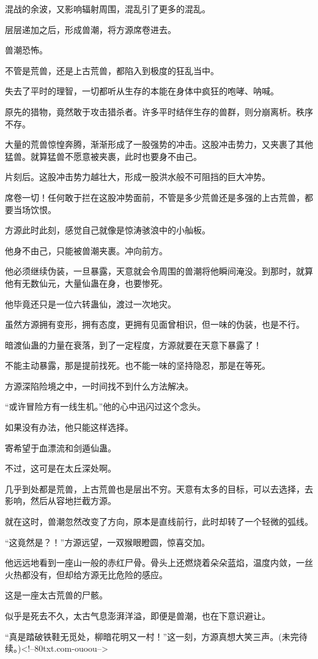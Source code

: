 \begin{this_body}
混战的余波，又影响辐射周围，混乱引了更多的混乱。

层层递加之后，形成兽潮，将方源席卷进去。

兽潮恐怖。

不管是荒兽，还是上古荒兽，都陷入到极度的狂乱当中。

失去了平时的理智，一切都听从生存的本能在身体中疯狂的咆哮、呐喊。

原先的猎物，竟然敢于攻击猎杀者。许多平时结伴生存的兽群，则分崩离析。秩序不存。

大量的荒兽惊惶奔腾，渐渐形成了一股强势的冲击。这股冲击势力，又夹裹了其他猛兽。就算猛兽不愿意被夹裹，此时也要身不由己。

片刻后。这股冲击势力越壮大，形成一股洪水般不可阻挡的巨大冲势。

席卷一切！任何敢于拦在这股冲势面前，不管是多少荒兽还是多强的上古荒兽，都要当场饮恨。

方源此时此刻，感觉自己就像是惊涛骇浪中的小舢板。

他身不由己，只能被兽潮夹裹。冲向前方。

他必须继续伪装，一旦暴露，天意就会令周围的兽潮将他瞬间淹没。到那时，就算他有无数仙元，大量仙蛊在身，也要惨死。

他毕竟还只是一位六转蛊仙，渡过一次地灾。

虽然方源拥有变形，拥有态度，更拥有见面曾相识，但一味的伪装，也是不行。

暗渡仙蛊的力量在衰落，到了一定程度，方源就要在天意下暴露了！

不能主动暴露，那是提前找死。也不能一味的坚持隐忍，那是在等死。

方源深陷险境之中，一时间找不到什么方法解决。

“或许冒险方有一线生机。”他的心中迅闪过这个念头。

如果没有办法，他只能这样选择。

寄希望于血漂流和剑遁仙蛊。

不过，这可是在太丘深处啊。

几乎到处都是荒兽，上古荒兽也是层出不穷。天意有太多的目标，可以去选择，去影响，然后从容地拦截方源。

就在这时，兽潮忽然改变了方向，原本是直线前行，此时却转了一个轻微的弧线。

“这竟然是？！”方源远望，一双猴眼瞪圆，惊喜交加。

他远远地看到一座山一般的赤红尸骨。骨头上还燃烧着朵朵蓝焰，温度内敛，一丝火热都没有，但却给方源无比危险的感应。

这是一座太古荒兽的尸骸。

似乎是死去不久，太古气息澎湃洋溢，即便是兽潮，也在下意识避让。

“真是踏破铁鞋无觅处，柳暗花明又一村！”这一刻，方源真想大笑三声。(未完待续。)<!--80txt.com-ouoou-->

\end{this_body}

